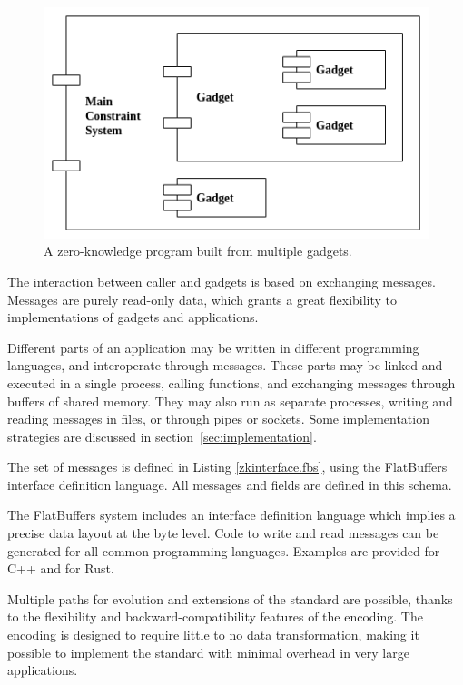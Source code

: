 \begin{figure}[!h]
	\centering
	\includegraphics[width=0.7\linewidth]{graphics/program_components.png}
	\caption{A zero-knowledge program built from multiple gadgets.}
	\label{fig:programcomponents}
\end{figure}



	The interaction between caller and gadgets is based on exchanging messages.
	Messages are purely read-only data, which grants a great flexibility to
	implementations of gadgets and applications.


	Different parts of an application may be written in different programming languages, and interoperate through messages.
	These parts may be linked and executed in a single process, calling functions,
	and exchanging messages through buffers of shared memory.
	They may also run as separate processes, writing and reading messages in files, or through pipes or sockets.
	Some implementation strategies are discussed in section~\ref{sec:implementation}.


	The set of messages is defined in Listing \ref{zkinterface.fbs},
	using the FlatBuffers interface definition language.
	All messages and fields are defined in this schema.

	The FlatBuffers system includes an interface definition language
	which implies a precise data layout at the byte level.
	Code to write and read messages can be generated for all common programming languages.
	Examples are provided for C++ and for Rust.

	Multiple paths for evolution and extensions of the standard are possible,
	thanks to the flexibility and backward-compatibility features of the encoding.
	The encoding is designed to require little to no data transformation, making it possible
	to implement the standard with minimal overhead in very large applications.


